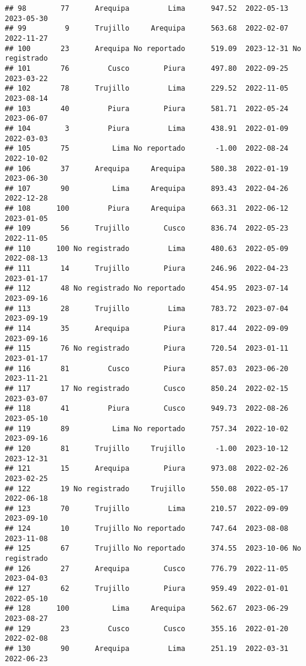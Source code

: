 \documentclass[
]{article}
\begin{document}
\begin{verbatim}
## 98        77      Arequipa         Lima      947.52  2022-05-13    2023-05-30
## 99         9      Trujillo     Arequipa      563.68  2022-02-07    2022-11-27
## 100       23      Arequipa No reportado      519.09  2023-12-31 No registrado
## 101       76         Cusco        Piura      497.80  2022-09-25    2023-03-22
## 102       78      Trujillo         Lima      229.52  2022-11-05    2023-08-14
## 103       40         Piura        Piura      581.71  2022-05-24    2023-06-07
## 104        3         Piura         Lima      438.91  2022-01-09    2022-03-03
## 105       75          Lima No reportado       -1.00  2022-08-24    2022-10-02
## 106       37      Arequipa     Arequipa      580.38  2022-01-19    2023-06-30
## 107       90          Lima     Arequipa      893.43  2022-04-26    2022-12-28
## 108      100         Piura     Arequipa      663.31  2022-06-12    2023-01-05
## 109       56      Trujillo        Cusco      836.74  2022-05-23    2022-11-05
## 110      100 No registrado         Lima      480.63  2022-05-09    2022-08-13
## 111       14      Trujillo        Piura      246.96  2022-04-23    2023-01-17
## 112       48 No registrado No reportado      454.95  2023-07-14    2023-09-16
## 113       28      Trujillo         Lima      783.72  2023-07-04    2023-09-19
## 114       35      Arequipa        Piura      817.44  2022-09-09    2023-09-16
## 115       76 No registrado        Piura      720.54  2023-01-11    2023-01-17
## 116       81         Cusco        Piura      857.03  2023-06-20    2023-11-21
## 117       17 No registrado        Cusco      850.24  2022-02-15    2023-03-07
## 118       41         Piura        Cusco      949.73  2022-08-26    2023-05-10
## 119       89          Lima No reportado      757.34  2022-10-02    2023-09-16
## 120       81      Trujillo     Trujillo       -1.00  2023-10-12    2023-12-31
## 121       15      Arequipa        Piura      973.08  2022-02-26    2023-02-25
## 122       19 No registrado     Trujillo      550.08  2022-05-17    2022-06-18
## 123       70      Trujillo         Lima      210.57  2022-09-09    2023-09-10
## 124       10      Trujillo No reportado      747.64  2023-08-08    2023-11-08
## 125       67      Trujillo No reportado      374.55  2023-10-06 No registrado
## 126       27      Arequipa        Cusco      776.79  2022-11-05    2023-04-03
## 127       62      Trujillo        Piura      959.49  2022-01-01    2022-05-10
## 128      100          Lima     Arequipa      562.67  2023-06-29    2023-08-27
## 129       23         Cusco        Cusco      355.16  2022-01-20    2022-02-08
## 130       90      Arequipa         Lima      251.19  2022-03-31    2022-06-23

\end{verbatim}
\end{document}
